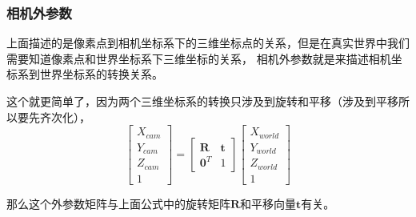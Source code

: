 \documentclass[12pt]{article}
\begin{document}
\subsubsection{相机外参数}
上面描述的是像素点到相机坐标系下的三维坐标点的关系，但是在真实世界中我们需要知道像素点和世界坐标系下三维坐标的关系，
相机外参数就是来描述相机坐标系到世界坐标系的转换关系。

这个就更简单了，因为两个三维坐标系的转换只涉及到旋转和平移（涉及到平移所以要先齐次化），
\begin{equation}
    \left[\begin{array}{l}
        X_{cam} \\
        Y_{cam} \\
        Z_{cam} \\
        1
        \end{array}\right]=\left[\begin{array}{ll}
        \mathbf{R} & \mathbf{t} \\
        \mathbf{0}^{T} & 1
        \end{array}\right]\left[\begin{array}{c}
        X_{world} \\
        Y_{world} \\
        Z_{world} \\
        1
        \end{array}\right]
\end{equation}

那么这个外参数矩阵与上面公式中的旋转矩阵$\mathbf{R}$和平移向量$\mathbf{t}$有关。
\end{document}
